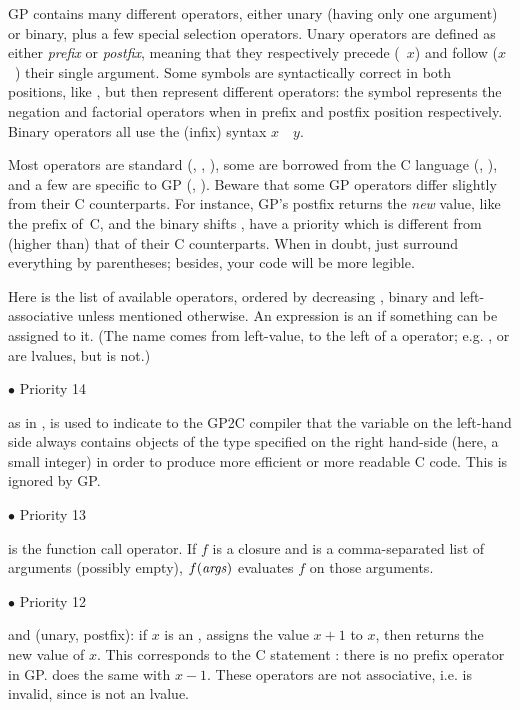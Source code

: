 GP contains many different operators, either unary (having only
one argument) or binary, plus a few special selection operators. Unary
operators are defined as either \emph{prefix}  or \emph{postfix}, meaning
that they respectively precede (~$x$) and follow ($x$~) their
single argument. Some symbols are syntactically correct in both positions,
like \kbd{!}, but then represent different operators: the \kbd{!} symbol
represents the negation and factorial operators when in prefix and postfix
position respectively. Binary operators all use the (infix) syntax
$x$~~$y$.

Most operators are standard (\kbd{+}, \kbd{\%}, \kbd{=}), some are
borrowed from the C language (\kbd{++}, \kbd{<<}), and a few are
specific to GP (\kbd{\bs}, \kbd{\#}). Beware that some GP operators differ
slightly from their C counterparts. For instance, GP's postfix \kbd{++}
returns the \emph{new} value, like the prefix \kbd{++} of~C, and the binary
shifts \kbd{<<}, \kbd{>>} have a priority which is different from (higher
than) that of their C counterparts. When in doubt, just surround everything
by parentheses; besides, your code will be more legible.

\noindent Here is the list of available operators, ordered by decreasing
, binary and left-associative unless mentioned otherwise. An
expression is an  if something can be assigned to it. (The name
comes from left-value, to the left of a \kbd{=} operator; e.g.
, or  are lvalues, but  is not.)

\def\point#1{\noindent $\bullet$ #1\hfill\break\indent\strut}
\point{Priority 14}
%
\kbd{:} as in , is used to indicate to the GP2C compiler that the
variable on the left-hand side always contains objects of the type specified
on the right hand-side (here, a small integer) in order to produce more
efficient or more readable C code. This is ignored by GP.

%
\point{Priority 13}
\kbd{( )} is the function call operator. If $f$ is a closure and 
is a comma-separated list of arguments (possibly empty),
$f{\tt (\hbox{\it args\/})}$ evaluates $f$ on those arguments.

\point{Priority 12}
%
\kbd{++} and \kbd{--} (unary, postfix): if $x$ is an ,
 assigns the value $x+1$ to $x$, then returns the new value of
$x$. This corresponds to the C statement : there is no prefix
\kbd{++} operator in GP.  does the same with $x-1$. These
operators are not associative, i.e.  is invalid, since
 is not an lvalue.


